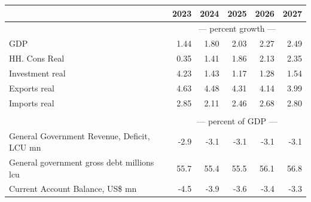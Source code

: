 \documentclass{article}
\begin{document}
\begin{table}[ht]
\begin{tabular}{lrrrrr}
\toprule
 & 2023 & 2024 & 2025 & 2026 & 2027 \\
\midrule
&\multicolumn{5}{c}{{--- percent growth ---}}                                                                                                     \\
GDP & 1.44 & 1.80 & 2.03 & 2.27 & 2.49 \\
HH. Cons Real & 0.35 & 1.41 & 1.86 & 2.13 & 2.35 \\
Investment real & 4.23 & 1.43 & 1.17 & 1.28 & 1.54 \\
Exports real & 4.63 & 4.48 & 4.31 & 4.14 & 3.99 \\
Imports real & 2.85 & 2.11 & 2.46 & 2.68 & 2.80 \\
&\multicolumn{5}{c}{{ }}                                                                                                     \\
&\multicolumn{5}{c}{{--- percent of GDP ---}}                                                                                                     \\
General Government Revenue, Deficit, LCU mn & -2.9 & -3.1 & -3.1 & -3.1 & -3.1 \\
General government gross debt millions lcu & 55.7 & 55.4 & 55.5 & 56.1 & 56.8 \\
Current Account Balance, US\$ mn & -4.5 & -3.9 & -3.6 & -3.4 & -3.3 \\
\bottomrule
\end{tabular}
\end{table}
\end{document}
